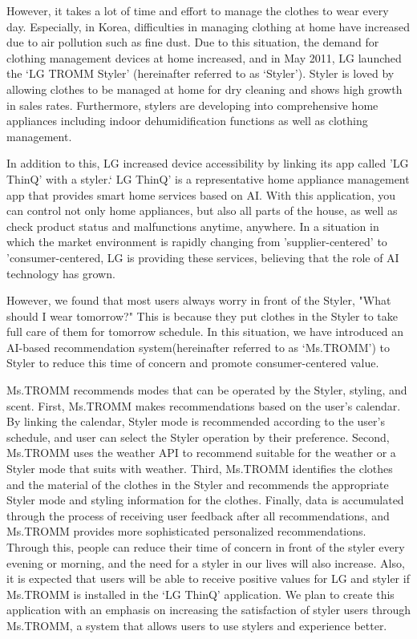 \documentclass[conference]{IEEEtran}
\begin{document}
However, it takes a lot of time and effort to manage the clothes to wear every day. Especially, in Korea, difficulties in managing clothing at home have increased due to air pollution such as fine dust. Due to this situation, the demand for clothing management devices at home increased, and in May 2011, LG launched the ‘LG TROMM Styler’ (hereinafter referred to as ‘Styler’). Styler is loved by allowing clothes to be managed at home for dry cleaning and shows high growth in sales rates. Furthermore, stylers are developing into comprehensive home appliances including indoor dehumidification functions as well as clothing management. 

In addition to this, LG increased device accessibility by linking its app called 'LG ThinQ' with a styler.‘ LG ThinQ’ is a representative home appliance management app that provides smart home services based on AI. With this application, you can control not only home appliances, but also all parts of the house, as well as check product status and malfunctions anytime, anywhere. In a situation in which the market environment is rapidly changing from 'supplier-centered' to 'consumer-centered, LG is providing these services, believing that the role of AI technology has grown.

However, we found that most users always worry in front of the Styler, "What should I wear tomorrow?" This is because they put clothes in the Styler to take full care of them for tomorrow schedule. In this situation, we have introduced an AI-based recommendation system(hereinafter referred to as ‘Ms.TROMM’) to Styler to reduce this time of concern and promote consumer-centered value. 

Ms.TROMM recommends modes that can be operated by the Styler, styling, and scent. First,  Ms.TROMM makes recommendations based on the user's calendar. By linking the calendar, Styler mode is recommended according to the user's schedule, and user can select the Styler operation by their preference. Second, Ms.TROMM uses the weather API to recommend suitable for the weather or a Styler mode that suits with weather. Third, Ms.TROMM identifies the clothes and the material of the clothes in the Styler and recommends the appropriate Styler mode and styling information for the clothes. Finally, data is accumulated through the process of receiving user feedback after all recommendations, and Ms.TROMM provides more sophisticated personalized recommendations. Through this, people can reduce their time of concern in front of the styler every evening or morning, and the need for a styler in our lives will also increase. Also, it is expected that users will be able to receive positive values for LG and styler if Ms.TROMM is installed in the ‘LG ThinQ’ application. We plan to create this application with an emphasis on increasing the satisfaction of styler users through Ms.TROMM, a system that allows users to use stylers and experience better.
\end{document}
